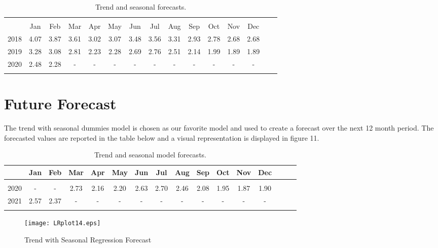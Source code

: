 \documentclass[12pt]{article}
\begin{document}
\begin{table}[!htbp] \centering 
  \caption{Trend and seasonal forecasts.} 
  \label{} 
\begin{tabular}{@{\extracolsep{5pt}} ccccccccccccccc} 
\\[-1.8ex]\hline 
\hline \\[-1.8ex]          
& Jan & Feb & Mar & Apr & May & Jun & Jul & Aug & Sep & Oct & Nov & Dec \\                            
2018 & 4.07  & 3.87 & 3.61 & 3.02  & 3.07  & 3.48 & 3.56  & 3.31 & 2.93 & 2.78 & 2.68  & 2.68 \\
2019 & 3.28  & 3.08  & 2.81 & 2.23 & 2.28 & 2.69  & 2.76  & 2.51  & 2.14  & 1.99  & 1.89& 1.89 \\
2020 & 2.48  & 2.28 & - & - & - & - & - & - & - & - & - & - \\  
\hline \\[-1.8ex] 
\end{tabular} 
\end{table} 

\section{Future Forecast}
The trend with seasonal dummies model is chosen as our favorite model and used to create a forecast over the next 12 month period. The forecasted values are reported in the table below and a visual representation is displayed in figure 11.


\begin{table}[!htbp] \centering 
  \caption{Trend and seasonal model forecasts.} 
  \label{} 
\begin{tabular}{@{\extracolsep{5pt}} cccccccccccccccc}   
& \textbf{Jan} & \textbf{Feb} & \textbf{Mar} & \textbf{Apr} & \textbf{May} & \textbf{Jun} & \textbf{Jul} & \textbf{Aug} & \textbf{Sep} & \textbf{Oct} & \textbf{Nov} & \textbf{Dec} \\
\hline \\[-1.8ex]   
2020 & - & - & 2.73 & 2.16 & 2.20 & 2.63 & 2.70 & 2.46 & 2.08 & 1.95 & 1.87 & 1.90 \\
2021 & 2.57 & 2.37 & - & - & - & - & - & - & - & - & - & -  \\
\hline \\[-1.8ex] 
\end{tabular} 
\end{table} 

\begin{figure}[h!]
\begin{center}
\texttt{[image: LRplot14.eps]} 
\label{fig:11}
\end{center}
\caption{ Trend with Seasonal Regression Forecast}
\end{figure}
\end{document}
